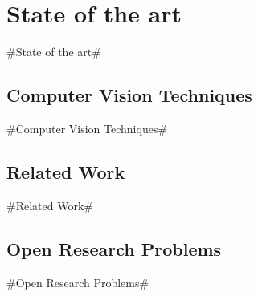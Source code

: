 \section{State of the art}
\#State of the art\#

\subsection{Computer Vision Techniques}

\#Computer Vision Techniques\#

\subsection{Related Work}

\#Related Work\#

\subsection{Open Research Problems}

\#Open Research Problems\#
